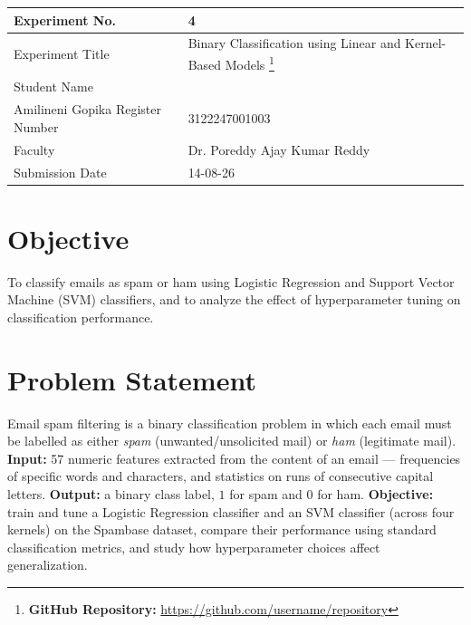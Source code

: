 \documentclass[12pt,a4paper]{article}
\begin{document}
\begin{tabular}{|p{4cm}|p{11cm}|}
\hline
Experiment No. & 4 \\ \hline
Experiment Title & Binary Classification using Linear and Kernel-Based Models
\footnote{\textbf{GitHub Repository: }\url{https://github.com/username/repository}}\\ \hline
Student Name & \\ Amilineni Gopika \hline
Register Number & 3122247001003 \\ \hline
Faculty & Dr. Poreddy Ajay Kumar Reddy \\ \hline
Submission Date & 14-08-26\\ \hline
\end{tabular}

\section{Objective}
To classify emails as spam or ham using Logistic Regression and Support Vector Machine (SVM)
classifiers, and to analyze the effect of hyperparameter tuning on classification performance.

\section{Problem Statement}
Email spam filtering is a binary classification problem in which each email must be labelled as
either \textit{spam} (unwanted/unsolicited mail) or \textit{ham} (legitimate mail).
\textbf{Input:} 57 numeric features extracted from the content of an email --- frequencies of
specific words and characters, and statistics on runs of consecutive capital letters.
\textbf{Output:} a binary class label, $1$ for spam and $0$ for ham.
\textbf{Objective:} train and tune a Logistic Regression classifier and an SVM classifier (across
four kernels) on the Spambase dataset, compare their performance using standard classification
metrics, and study how hyperparameter choices affect generalization.
\end{document}
